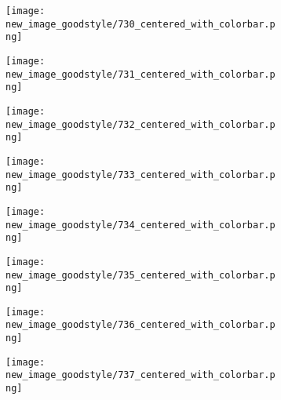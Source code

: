 \documentclass[a4paper,12pt]{article}
\begin{document}
\begin{figure}[H]
  \begin{subfigure}{0.11\textwidth}
    \texttt{[image: new\_image\_goodstyle/730\_centered\_with\_colorbar.png]}
  \end{subfigure}
  \hfill
  \begin{subfigure}{0.11\textwidth}
    \texttt{[image: new\_image\_goodstyle/731\_centered\_with\_colorbar.png]}
  \end{subfigure}
  \hfill
  \begin{subfigure}{0.11\textwidth}
    \texttt{[image: new\_image\_goodstyle/732\_centered\_with\_colorbar.png]}
  \end{subfigure}
  \hfill
  \begin{subfigure}{0.11\textwidth}
    \texttt{[image: new\_image\_goodstyle/733\_centered\_with\_colorbar.png]}
  \end{subfigure}
  \hfill
  \begin{subfigure}{0.11\textwidth}
    \texttt{[image: new\_image\_goodstyle/734\_centered\_with\_colorbar.png]}
  \end{subfigure}
  \hfill
  \begin{subfigure}{0.11\textwidth}
    \texttt{[image: new\_image\_goodstyle/735\_centered\_with\_colorbar.png]}
  \end{subfigure}
  \hfill
  \begin{subfigure}{0.11\textwidth}
    \texttt{[image: new\_image\_goodstyle/736\_centered\_with\_colorbar.png]}
  \end{subfigure}
  \hfill
  \begin{subfigure}{0.11\textwidth}
    \texttt{[image: new\_image\_goodstyle/737\_centered\_with\_colorbar.png]}
  \end{subfigure}
  \hfill
\end{figure}
\end{document}
